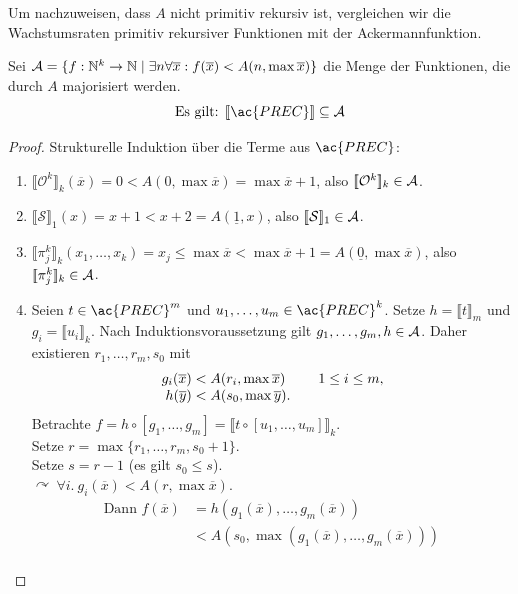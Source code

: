 Um nachzuweisen, dass $A$ nicht primitiv rekursiv ist, vergleichen wir die
Wachstumsraten primitiv rekursiver Funktionen mit der Ackermannfunktion.
\begin{Satz}
	Sei $\A=\{f:\N^k\->\N \mid \exists n \forall\overline{x}:f(\overline{x})< A(n,\max\overline{x})\}$ die Menge der Funktionen, die durch $A$ majorisiert werden. 
	\[ \text{Es gilt: }\llbracket\ac{PREC}\rrbracket\subseteq \A \]\vspace{-2em}
\end{Satz}
\begin{proof}
	Strukturelle Induktion über die Terme aus $\ac{PREC}$:
	\begin{enumerate}
	\item $\llbracket\mathcal{O}^k\rrbracket_k(\overline{x})=0
		< A(0,\max\overline{x})=\max \overline{x}+1$, also
		$[\![\mathcal{O}^k]\!]_k\in\mathcal{A}$.
	\item $\llbracket\mathcal{S}\rrbracket_1(x)=x+1
		< x+2 = A(\underline{1},x)$,
		also $[\![\mathcal{S}]\!]_1\in\mathcal{A}$.
	\item $\llbracket\pi^k_j\rrbracket_k(x_1,\dots,x_k)
		= x_j\leq \max\overline{x} < \max \overline{x} +1
		= A(\underline{0},\max \overline{x})$, also
		$[\![\pi^k_j]\!]_k\in\mathcal{A}$.
	\item
		Seien $t\in\ac{PREC}^m$ und
		$u_1,\dots,u_m\in\ac{PREC}^k$. Setze
		$h=\llbracket t\rrbracket_m$ und
		$g_i=\llbracket u_i\rrbracket_k$. Nach Induktionsvoraussetzung gilt
		$g_1,\dots,g_m,h\in\mathcal{A}$. Daher existieren $r_1,\dots,r_m,s_0$ mit
		\begin{align*}
			&\begin{array}{rr@{}>{{}}l@{\qquad}r@{\;}l}
				&g_i(\overline{x}) &< A(r_i,\max\overline{x}) & 1\leq i\leq m,\\
				&h(\overline{y}) &< A(s_0,\max\overline{y}).
			\end{array}
		\end{align*}
		Betrachte
		$f=h\circ[g_1,\dots,g_m]
		=\llbracket t\circ[u_1,\dots,u_m]\rrbracket_k$.\\
		Setze $r=\max\{r_1,\dots, r_m, s_0+1\}$.\\
		Setze $s=r - 1$ (es gilt $s_0\le s$).\\
		$\curvearrowright\ \forall i.\ g_i(\overline{x}) < A(r,\max\overline{x})$.
		\begin{align*}
			\text{Dann }f(\overline{x}) &= h(g_1(\overline{x}),\dots,g_m(\overline{x}))\\
			&< A(s_0,\max(g_1(\overline{x}),\dots,g_m(\overline{x})))\\

\end{align*}
\end{enumerate}
\end{proof}
